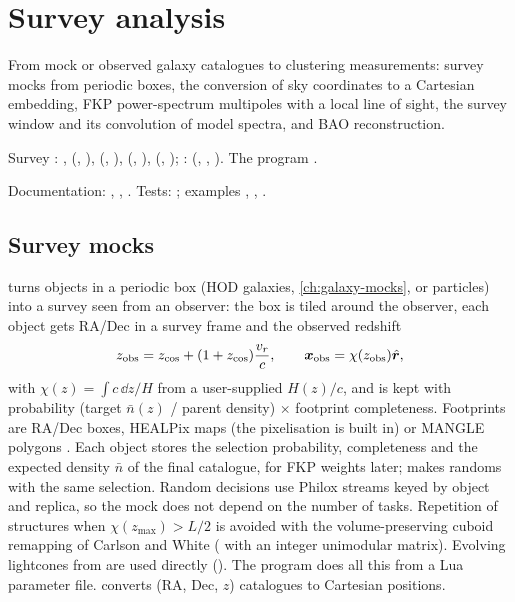 \chapter{Survey analysis}\label{ch:surveys}

From mock or observed galaxy catalogues to clustering measurements: survey mocks from periodic boxes, the conversion of
sky coordinates to a Cartesian embedding, FKP power-spectrum multipoles with a local line of sight, the survey window and its
convolution of model spectra, and BAO reconstruction.

\begin{modulebox}{Survey}
: ,  (, ),
 (, ),  (,
),  (, );
:  (, , ). The program
.\par
Documentation: , , . Tests: ; examples
, , .
\end{modulebox}

\section{Survey mocks}\label{sec:survey-mocks}

 turns objects in a periodic box (HOD galaxies, \cref{ch:galaxy-mocks}, or particles) into a survey seen from an observer:
the box is tiled around the observer, each object gets RA/Dec in a survey frame and the observed redshift
\begin{equation}
z_{\rm obs}=z_{\rm cos}+(1+z_{\rm cos})\frac{v_r}{c},\qquad\bm x_{\rm obs}=\chi(z_{\rm obs})\hat{\bm r},
\end{equation}
with $\chi(z)=\int c\,\dd z/H$ from a user-supplied $H(z)/c$, and is kept with probability (target $\bar n(z)$ / parent density) $\times$ footprint
completeness. Footprints are RA/Dec boxes, HEALPix maps \cite{Gorski2005} (the pixelisation is built in) or MANGLE polygons \cite{Swanson2008}.
Each object stores the selection probability, completeness and the expected density $\bar n$ of the final catalogue, for FKP weights later;
 makes randoms with the same selection. Random decisions use Philox streams keyed by object and replica, so the mock does not
depend on the number of tasks. Repetition of structures when $\chi(z_{\max})>L/2$ is avoided with the volume-preserving cuboid remapping of Carlson
and White \cite{CarlsonWhite2010} ( with an integer unimodular matrix). Evolving lightcones from  are
used directly (). The program  does all this from a Lua parameter file. 
converts (RA, Dec, $z$) catalogues to Cartesian positions.

